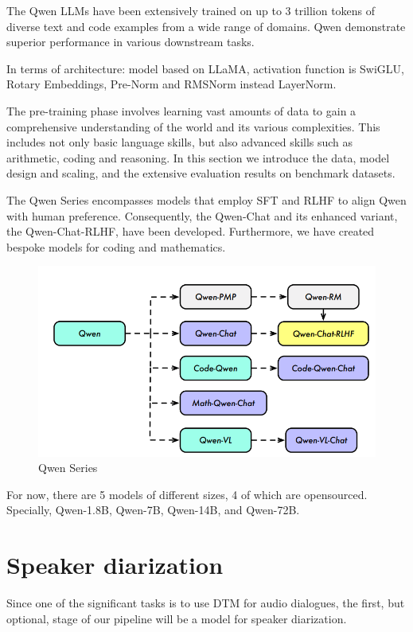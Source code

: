 \documentclass[PMI,VKR]{HSEUniversity}
\begin{document}
The Qwen LLMs have been extensively trained on up to 3 trillion tokens of diverse text and code examples from a wide range of domains. 
Qwen demonstrate superior performance in various downstream tasks.

In terms of architecture: model based on LLaMA, activation function is SwiGLU, Rotary Embeddings, Pre-Norm and RMSNorm instead LayerNorm. 

The pre-training phase involves learning vast amounts of data to gain a comprehensive understanding of the world and its various complexities. 
This includes not only basic language skills, but also advanced skills such as arithmetic, coding and reasoning. 
In this section we introduce the data, model design and scaling, and the extensive evaluation results on benchmark datasets.

The Qwen Series encompasses models that employ SFT and RLHF to align Qwen with human preference. 
Consequently, the Qwen-Chat and its enhanced variant, the Qwen-Chat-RLHF, have been developed. Furthermore, we have created bespoke models for coding and mathematics.

\begin{figure}[h]
    \centering
    \includegraphics[scale=1]{img/qwen.png}
    \caption{Qwen Series}
\end{figure} 

For now, there are 5 models of different sizes, 4 of which are opensourced. Specially, Qwen-1.8B, Qwen-7B, Qwen-14B, and Qwen-72B.

\section{Speaker diarization}

Since one of the significant tasks is to use DTM for audio dialogues, the first, but optional, stage of our pipeline will be a model for speaker diarization. 
\end{document}
